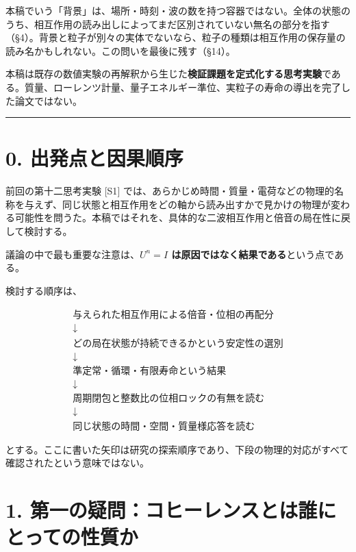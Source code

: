 \documentclass[
  a4paper,
]{ltjsarticle}
\begin{document}
本稿でいう「背景」は、場所・時刻・波の数を持つ容器ではない。全体の状態のうち、相互作用の読み出しによってまだ区別されていない無名の部分を指す（§4）。背景と粒子が別々の実体でないなら、粒子の種類は相互作用の保存量の読み名かもしれない。この問いを最後に残す（§14）。

本稿は既存の数値実験の再解釈から生じた\textbf{検証課題を定式化する思考実験}である。質量、ローレンツ計量、量子エネルギー準位、実粒子の寿命の導出を完了した論文ではない。

\begin{center}\rule{0.5\linewidth}{0.5pt}\end{center}

\section{0.
出発点と因果順序}\label{ux51faux767aux70b9ux3068ux56e0ux679cux9806ux5e8f}

前回の第十二思考実験 {[}S1{]}
では、あらかじめ時間・質量・電荷などの物理的名称を与えず、同じ状態と相互作用をどの軸から読み出すかで見かけの物理が変わる可能性を問うた。本稿ではそれを、具体的な二波相互作用と倍音の局在性に戻して検討する。

議論の中で最も重要な注意は、\textbf{\(U^n=I\)
は原因ではなく結果である}という点である。

検討する順序は、

\[
\begin{gathered}
\text{与えられた相互作用による倍音・位相の再配分}\\
\downarrow\\
\text{どの局在状態が持続できるかという安定性の選別}\\
\downarrow\\
\text{準定常・循環・有限寿命という結果}\\
\downarrow\\
\text{周期閉包と整数比の位相ロックの有無を読む}\\
\downarrow\\
\text{同じ状態の時間・空間・質量様応答を読む}
\end{gathered}
\]

とする。ここに書いた矢印は研究の探索順序であり、下段の物理的対応がすべて確認されたという意味ではない。

\section{1.
第一の疑問：コヒーレンスとは誰にとっての性質か}\label{ux7b2cux4e00ux306eux7591ux554fux30b3ux30d2ux30fcux30ecux30f3ux30b9ux3068ux306fux8ab0ux306bux3068ux3063ux3066ux306eux6027ux8ceaux304b}
\end{document}
